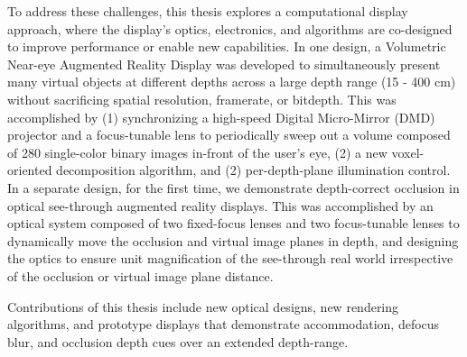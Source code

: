 To address these challenges, this thesis explores a computational display approach, where the display’s optics, electronics, and algorithms are co-designed to improve performance or enable new capabilities. In one design, a Volumetric Near-eye Augmented Reality Display was developed to simultaneously present many virtual objects at different depths across a large depth range (15 - 400 cm) without sacrificing spatial resolution, framerate, or bitdepth. This was accomplished by (1) synchronizing a high-speed Digital Micro-Mirror (DMD) projector and a focus-tunable lens to periodically sweep out a volume composed of 280 single-color binary images in-front of the user's eye, (2) a new voxel-oriented decomposition algorithm, and (2) per-depth-plane illumination control. In a separate design, for the first time, we demonstrate depth-correct occlusion in optical see-through augmented reality displays. This was accomplished by an optical system composed of two fixed-focus lenses and two focus-tunable lenses to dynamically move the occlusion and virtual image planes in depth, and designing the optics to ensure unit magnification of the see-through real world irrespective of the occlusion or virtual image plane distance. 

Contributions of this thesis include new optical designs, new rendering algorithms, and prototype displays that demonstrate accommodation, defocus blur, and occlusion depth cues over an extended depth-range. 

